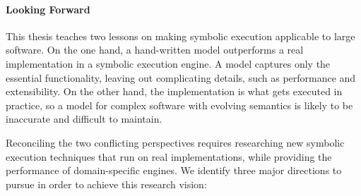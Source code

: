 \paragraph{Looking Forward}

This thesis teaches two lessons on making symbolic execution applicable to large software.
%
On the one hand, a hand-written model outperforms a real implementation in a symbolic execution engine.  A model captures only the essential functionality, leaving out complicating details, such as performance and extensibility.
%
On the other hand, the implementation is what gets executed in practice, so a model for complex software with evolving semantics is likely to be inaccurate and difficult to maintain.

Reconciling the two conflicting perspectives requires researching new symbolic execution techniques that run on real implementations, while providing the performance of domain-specific engines.
%
We identify three major directions to pursue in order to achieve this research vision:


